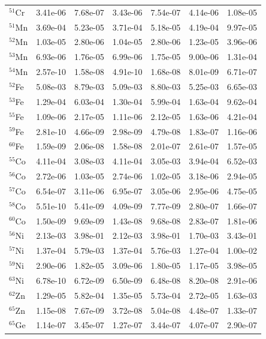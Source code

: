 \begin{table}
\begin{tabular}{l|cc|cc|cc}
$^{51}$Cr & 3.41e-06 & 7.68e-07 & 3.43e-06 & 7.54e-07 & 4.14e-06 & 1.08e-05\\
$^{51}$Mn & 3.69e-04 & 5.23e-05 & 3.71e-04 & 5.18e-05 & 4.19e-04 & 9.97e-05\\
$^{52}$Mn & 1.03e-05 & 2.80e-06 & 1.04e-05 & 2.80e-06 & 1.23e-05 & 3.96e-06\\
$^{53}$Mn & 6.93e-06 & 1.76e-05 & 6.99e-06 & 1.75e-05 & 9.00e-06 & 1.31e-04\\
$^{54}$Mn & 2.57e-10 & 1.58e-08 & 4.91e-10 & 1.68e-08 & 8.01e-09 & 6.71e-07\\
$^{52}$Fe & 5.08e-03 & 8.79e-03 & 5.09e-03 & 8.80e-03 & 5.25e-03 & 6.65e-03\\
$^{53}$Fe & 1.29e-04 & 6.03e-04 & 1.30e-04 & 5.99e-04 & 1.63e-04 & 9.62e-04\\
$^{55}$Fe & 1.09e-06 & 2.17e-05 & 1.11e-06 & 2.12e-05 & 1.63e-06 & 4.21e-04\\
$^{59}$Fe & 2.81e-10 & 4.66e-09 & 2.98e-09 & 4.79e-08 & 1.83e-07 & 1.16e-06\\
$^{60}$Fe & 1.59e-09 & 2.06e-08 & 1.58e-08 & 2.01e-07 & 2.61e-07 & 1.57e-05\\
$^{55}$Co & 4.11e-04 & 3.08e-03 & 4.11e-04 & 3.05e-03 & 3.94e-04 & 6.52e-03\\
$^{56}$Co & 2.72e-06 & 1.03e-05 & 2.74e-06 & 1.02e-05 & 3.18e-06 & 2.94e-05\\
$^{57}$Co & 6.54e-07 & 3.11e-06 & 6.95e-07 & 3.05e-06 & 2.95e-06 & 4.75e-05\\
$^{58}$Co & 5.51e-10 & 5.41e-09 & 4.09e-09 & 7.77e-09 & 2.80e-07 & 1.66e-07\\
$^{60}$Co & 1.50e-09 & 9.69e-09 & 1.43e-08 & 9.68e-08 & 2.83e-07 & 1.81e-06\\
$^{56}$Ni & 2.13e-03 & 3.98e-01 & 2.12e-03 & 3.98e-01 & 1.70e-03 & 3.43e-01\\
$^{57}$Ni & 1.37e-04 & 5.79e-03 & 1.37e-04 & 5.76e-03 & 1.27e-04 & 1.00e-02\\
$^{59}$Ni & 2.90e-06 & 1.82e-05 & 3.09e-06 & 1.80e-05 & 1.17e-05 & 3.98e-05\\
$^{63}$Ni & 6.78e-10 & 6.72e-09 & 6.50e-09 & 6.48e-08 & 8.20e-08 & 2.91e-06\\
$^{62}$Zn & 1.29e-05 & 5.82e-04 & 1.35e-05 & 5.73e-04 & 2.72e-05 & 1.63e-03\\
$^{65}$Zn & 1.15e-08 & 7.67e-09 & 3.72e-08 & 5.04e-08 & 4.48e-07 & 1.33e-07\\
$^{65}$Ge & 1.14e-07 & 3.45e-07 & 1.27e-07 & 3.44e-07 & 4.07e-07 & 2.90e-07\\
\hline
\end{tabular}
\end{table}
